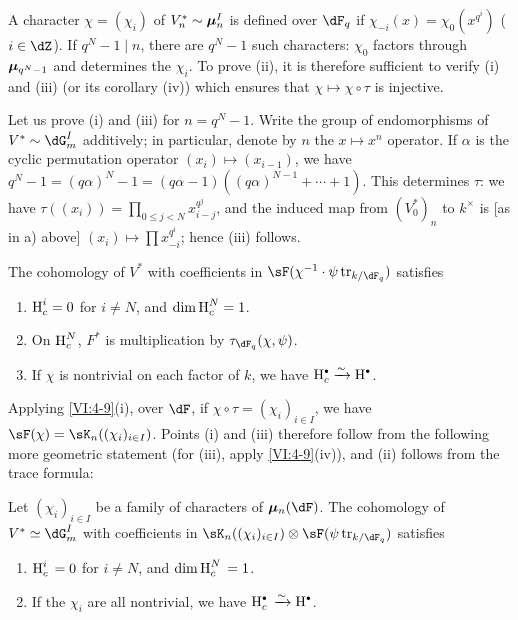 A character $\chi=(\chi_i)$ of $V_n^\ast\sim {\bm\mu}_n^I$ is defined over 
$\dF_q$ if $\chi_{-i}(x) =\chi_0(x^{q^i})$ ($i\in \dZ$). If $q^N-1\mid n$, there are 
$q^N-1$ such characters: $\chi_0$ factors through ${\bm\mu}_{q^N-1}$ and 
determines the $\chi_i$. To prove (ii), it is therefore sufficient to verify (i) 
and (iii) (or its corollary (iv)) which ensures that $\chi\mapsto \chi\circ \tau$ 
is injective. 

Let us prove (i) and (iii) for $n=q^N-1$. Write the group of 
endomorphisms of $V^\ast\sim \dG_m^I$ additively; in particular, denote by $n$ 
the $x\mapsto x^n$ operator. If $\alpha$ is the cyclic permutation operator 
$(x_i)\mapsto (x_{i-1})$, we have 
$q^N-1=(q\alpha)^N-1 = (q\alpha-1)((q\alpha)^{N-1}+\cdots + 1)$. This 
determines $\tau$: we have $\tau((x_i)) = \prod_{0\leqslant j<N} x_{i-j}^{q^j}$, 
and the induced map from $(V_0^\ast)_n$ to $k^\times$ is [as in a) above] 
$(x_i)\mapsto \prod x_{-i}^{q^i}$; hence (iii) follows. 





\begin{proposition_}\label{VI:4-10}
The cohomology of $V^\ast$ with coefficients in 
$\sF(\chi^{-1}\cdot \psi\tr_{k/\dF_q})$ satisfies 
\begin{enumerate}[\indent (i)]
  \item $\operatorname{H}_c^i = 0$ for $i\ne N$, and $\dim \operatorname{H}_c^N=1$. 
  \item On $\operatorname{H}_c^N$, $F^\ast$ is multiplication by 
    $\tau_{\dF_q}(\chi,\psi)$. 
  \item If $\chi$ is nontrivial on each factor of $k$, we have 
    $\h_c^\bullet \iso \h^\bullet$. 
\end{enumerate}
\end{proposition_}

Applying \ref{VI:4-9}(i), over $\dF$, if $\chi\circ \tau=(\chi_i)_{i\in I}$, 
we have $\sF(\chi) = \sK_n((\chi_i)_{i\in I})$. Points (i) and (iii) 
therefore follow from the following more geometric statement (for (iii), 
apply \ref{VI:4-9}(iv)), and (ii) follows from the trace formula: 





\begin{proposition_}\label{VI:4-11}
Let $(\chi_i)_{i\in I}$ be a family of characters of $\dmu_n(\dF)$. The 
cohomology of $V^\ast\simeq \dG_m^I$ with coefficients in 
$\sK_n((\chi_i)_{i\in I})\otimes \sF(\psi\tr_{k/\dF_q})$ satisfies 
\begin{enumerate}[\indent (i)]
  \item $\operatorname{H}_c^i{}=0$ for $i\ne N$, and $\dim \operatorname{H}_c^N{} = 1$. 
  \item If the $\chi_i$ are all nontrivial, we have 
    $\h_c^\bullet{}\iso \h^\bullet$. 
\end{enumerate}
\end{proposition_}

